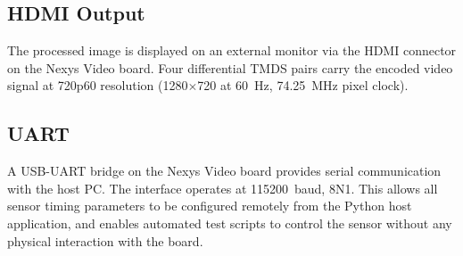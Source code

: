 \subsection{HDMI Output}

The processed image is displayed on an external monitor via the HDMI
connector on the Nexys Video board. Four differential TMDS pairs carry
the encoded video signal at 720p60 resolution (1280$\times$720 at 60~Hz,
74.25~MHz pixel clock).

\subsection{UART}

A USB-UART bridge on the Nexys Video board provides serial communication
with the host PC. The interface operates at 115200~baud, 8N1. This allows
all sensor timing parameters to be configured remotely from the Python
host application, and enables automated test scripts to control the sensor
without any physical interaction with the board.

